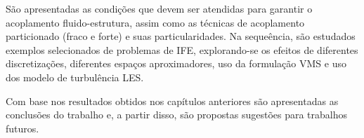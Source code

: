 {        %

         São apresentadas as condições que devem ser atendidas para garantir o acoplamento fluido-estrutura, assim como as técnicas de acoplamento particionado (fraco e forte) e suas particularidades. Na sequeência, são estudados exemplos selecionados de problemas de IFE, explorando-se os efeitos de diferentes discretizações, diferentes espaços aproximadores, uso da formulação VMS e uso dos modelo de turbulência LES.

         Com base nos resultados obtidos nos capítulos anteriores são apresentadas as conclusões do trabalho e, a partir disso, são propostas sugestões para trabalhos futuros.
    }